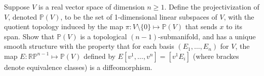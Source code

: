Suppose $V$ is a real vector space of dimension $n\geq 1$.  Define the projectivization of $V$, denoted $\mathbb{P}(V)$, to be the set of 1-dimensional linear subspaces of $V$, with the quotient topology induced by the map $\pi:V\setminus\{0\}\mapsto \mathbb{P}(V)$ that sends $x$ to its span.  Show that $\mathbb{P}(V)$ is a topological $(n-1)$-submanifold, and has a unique smooth structure with the property that for each basis $(E_1, \ldots, E_n)$ for $V$, the map $E:\mathbb{RP}^{n-1}\mapsto \mathbb{P}(V)$ defined by $E[v^1,\ldots,v^n]=[v^1E_i]$ (where brackes denote equivalence classes) is a diffeomorphism.